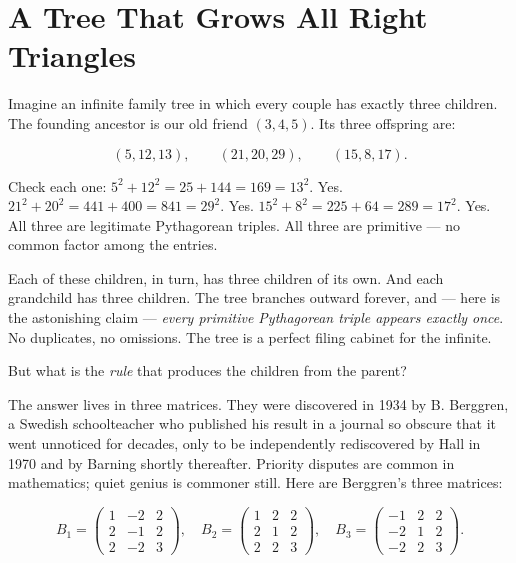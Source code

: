 \documentclass[11pt,openright,twoside]{book}
\theoremstyle{definition}
\begin{document}
\bigskip


\section{A Tree That Grows All Right Triangles}

Imagine an infinite family tree in which every couple has exactly three children. The founding ancestor is our old friend $(3, 4, 5)$. Its three offspring are:

\[(5, 12, 13), \qquad (21, 20, 29), \qquad (15, 8, 17).\]

Check each one: $5^2 + 12^2 = 25 + 144 = 169 = 13^2$. Yes. $21^2 + 20^2 = 441 + 400 = 841 = 29^2$. Yes. $15^2 + 8^2 = 225 + 64 = 289 = 17^2$. Yes. All three are legitimate Pythagorean triples. All three are primitive --- no common factor among the entries.

Each of these children, in turn, has three children of its own. And each grandchild has three children. The tree branches outward forever, and --- here is the astonishing claim --- \textit{every primitive Pythagorean triple appears exactly once}. No duplicates, no omissions. The tree is a perfect filing cabinet for the infinite.

But what is the \textit{rule} that produces the children from the parent?

The answer lives in three matrices. They were discovered in 1934 by B. Berggren, a Swedish schoolteacher who published his result in a journal so obscure that it went unnoticed for decades, only to be independently rediscovered by Hall in 1970 and by Barning shortly thereafter. Priority disputes are common in mathematics; quiet genius is commoner still. Here are Berggren's three matrices:

\[B_1 = \begin{pmatrix} 1 & -2 & 2 \\ 2 & -1 & 2 \\ 2 & -2 & 3 \end{pmatrix}, \quad B_2 = \begin{pmatrix} 1 & 2 & 2 \\ 2 & 1 & 2 \\ 2 & 2 & 3 \end{pmatrix}, \quad B_3 = \begin{pmatrix} -1 & 2 & 2 \\ -2 & 1 & 2 \\ -2 & 2 & 3 \end{pmatrix}.\]
\end{document}
